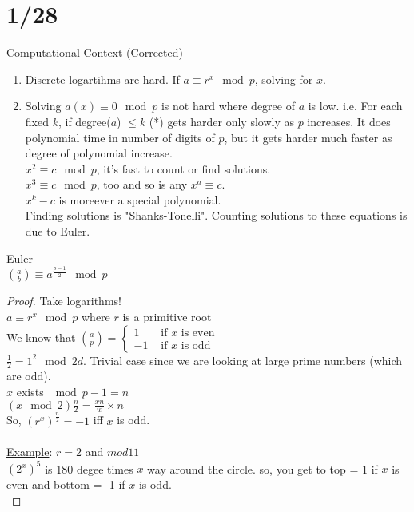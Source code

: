 \section*{1/28}
  Computational Context (Corrected)
  \begin{enumerate}
    \item Discrete logartihms are hard. If $a \equiv r^x \mod p$, solving for
      $x$.
    \item Solving $a(x) \equiv 0 \mod p$ is not hard where degree of $a$ is
      low. i.e. For each fixed $k$, if degree($a$) $\le k$ (*) gets harder
      only slowly as $p$ increases. It does polynomial time in number of digits
      of $p$, but it gets harder much faster as degree of polynomial increase.\\
      $x^2 \equiv c \mod p$, it's fast to count or find solutions.\\
      $x^3 \equiv c \mod p$, too and so is any $x^a \equiv c$.\\
      $x^k - c$ is moreever a special polynomial.\\
      Finding solutions is "Shanks-Tonelli". Counting solutions to these 
      equations is due to Euler.
  \end{enumerate}
  \begin{theorem}Euler\\
    $(\frac{a}{b}) \equiv a^{\frac{p-1}{2}} \mod p$
  \end{theorem}
  \begin{proof}
    Take logarithms!\\
    $a \equiv r^x \mod p$ where $r$ is a primitive root\\
    We know that $(\frac{a}{p}) = \begin{cases}1 & \text{ if $x$ is even}\\ -1
    & \text{ if $x$ is odd}\end{cases}$\\
    $\frac{1}{2} = 1^2 \mod 2d$. Trivial case since we are looking at large 
    prime numbers (which are odd).\\
  $x$ exists $\mod p-1 = n$\\
  $(x \mod 2) \frac{n}{2} = \frac{xn}{w} \times n$\\
  So, $(r^x)^{\frac{n}{2}} = -1$ iff $x$ is odd.\\\\
  \underline{Example}: $r = 2$ and $mod 11$\\
  $(2^x)^5$ is 180 degee times $x$ way around the circle. so, you get
  to top = 1 if $x$ is even and bottom = -1 if $x$ is odd.\\
  \end{proof}

